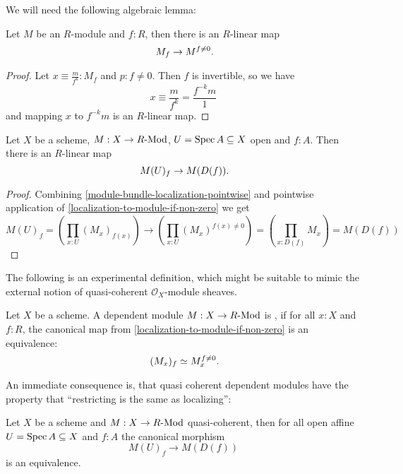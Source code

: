 We will need the following algebraic lemma:

\begin{lemma}%
  \label{localization-to-module-if-non-zero}
  Let $M$ be an $R$-module and $f:R$,
  then there is an $R$-linear map
  \[
    M_f\to M^{f\neq 0}
    \rlap{.}
  \]
\end{lemma}

\begin{proof}
  Let $x\equiv \frac{m}{f^k}:M_f$ and $p:f\neq 0$.
  Then $f$ is invertible, so we have
  \[
    x\equiv \frac{m}{f^k}=\frac{f^{-k}m}{1}
  \]
  and mapping $x$ to $f^{-k}m$ is an $R$-linear map.
  
\end{proof}

\begin{lemma}%
  \label{localization-to-restriction}                    
  Let $X$ be a scheme, $M:X\to R\text{-}\mathrm{Mod}$, $U=\operatorname{Spec} A\subseteq X$ open and $f:A$.
  Then there is an $R$-linear map
  \[
    M(U)_f \to M(D(f)) 
    \rlap{.}
  \]
\end{lemma}

\begin{proof}
  Combining \cref{module-bundle-localization-pointwise}
  and pointwise application of \cref{localization-to-module-if-non-zero} we get
  \[
    M(U)_f=\left(\prod_{x:U}(M_x)_{f(x)}\right)\to \left(\prod_{x:U}(M_x)^{f(x)\neq 0}\right)
    =\left(\prod_{x:D(f)}M_x\right)
    =M(D(f))
  \]
\end{proof}

The following is an experimental definition,
which might be suitable
to mimic the external notion of quasi-coherent $\mathcal O_X$-module sheaves.

\begin{definition}%
  Let $X$ be a scheme.
  A dependent module $M:X\to R\text{-}\mathrm{Mod}$ is ,
  if for all $x:X$ and $f:R$,
  the canonical map from \cref{localization-to-module-if-non-zero} is an equivalence:
  \[
    (M_x)_f\simeq M_x^{f\neq 0}
    \rlap{.}
  \]
\end{definition}

An immediate consequence is, that
quasi coherent dependent modules have
the property that ``restricting is the same as localizing'':

\begin{lemma}
  Let $X$ be a scheme and $M:X\to R\text{-}\mathrm{Mod}$ quasi-coherent,
  then for all open affine $U=\operatorname{Spec} A\subseteq X$ and $f:A$
  the canonical morphism
  \[
    M(U)_f\to M(D(f))
  \]
  is an equivalence.
\end{lemma}

